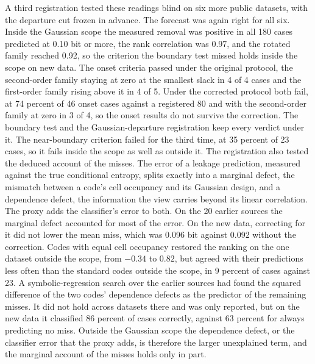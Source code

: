\documentclass[11pt]{article}
\begin{document}
A third registration tested these readings blind on six more public
datasets, with the departure cut frozen in advance. The forecast was
again right for all six. Inside the Gaussian scope the measured removal
was positive in all 180 cases predicted at 0.10 bit or more, the rank
correlation was 0.97, and the rotated family reached 0.92, so the
criterion the boundary test missed holds inside the scope on new data.
The onset criteria passed under the original protocol, the second-order
family staying at zero at the smallest slack in 4 of 4 cases and the
first-order family rising above it in 4 of 5. Under the corrected
protocol both fail, at 74 percent of 46 onset cases against a registered
80 and with the second-order family at zero in 3 of 4, so the onset
results do not survive the correction. The boundary test and the
Gaussian-departure registration keep every verdict under it. The near-boundary criterion failed for the third
time, at 35 percent of 23 cases, so it fails inside the scope as well as
outside it. The registration also tested the deduced account of the
misses. The error of a leakage prediction, measured against the true
conditional entropy, splits exactly into a marginal defect, the mismatch
between a code's cell occupancy and its Gaussian design, and a
dependence defect, the information the view carries beyond its linear
correlation. The proxy adds the classifier's error to both. On the 20 earlier sources the
marginal defect accounted for most of the error. On the new data,
correcting for it did not lower the mean miss, which was 0.096 bit
against 0.092 without the correction. Codes with equal cell occupancy
restored the ranking on the one dataset outside the scope, from $-0.34$
to $0.82$, but agreed with their predictions less often than the
standard codes outside the scope, in 9 percent of cases against 23. A
symbolic-regression search over the earlier sources had found the
squared difference of the two codes' dependence defects as the predictor
of the remaining misses. It did not hold across datasets there and was
only reported, but on the new data it classified 86 percent of cases
correctly, against 63 percent for always predicting no miss. Outside the Gaussian scope the dependence
defect, or the classifier error that the proxy adds, is therefore the
larger unexplained term, and the marginal account of the misses holds
only in part.
\end{document}
